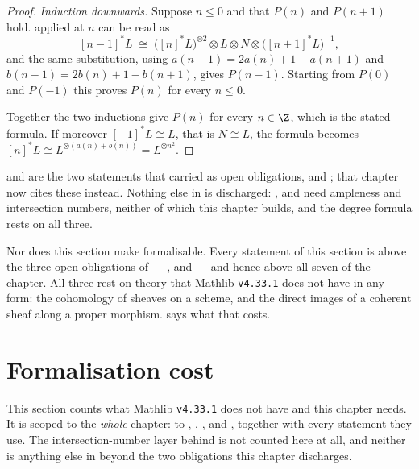 \begin{proof}
\emph{Induction downwards.}  Suppose $n\leq0$ and that $P(n)$ and $P(n+1)$
hold.   applied at $n$ can be read as
\[
  [n-1]^*L\;\cong\;\bigl([n]^*L\bigr)^{\otimes2}\otimes L\otimes N\otimes
  \bigl([n+1]^*L\bigr)^{-1} ,
\]
and the same substitution, using $a(n-1)=2a(n)+1-a(n+1)$ and
$b(n-1)=2b(n)+1-b(n+1)$, gives $P(n-1)$.  Starting from $P(0)$ and $P(-1)$
this proves $P(n)$ for every $n\leq0$.

Together the two inductions give $P(n)$ for every $n\in\Z$, which is the stated
formula.  If moreover $[-1]^*L\cong L$, that is $N\cong L$, the formula becomes
$[n]^*L\cong L^{\otimes(a(n)+b(n))}=L^{\otimes n^2}$.
\end{proof}

\begin{remark}
\label{rem:cube-discharged}
 and  are the two statements
that  carried as open obligations,  and
; that chapter now cites these instead.  Nothing
else in  is discharged: ,
 and 
need ampleness and intersection numbers, neither of which this chapter builds,
and the degree formula  rests on all three.

Nor does this section make  formalisable.  Every
statement of this section is above the three open obligations of
 --- ,
 and  --- and
hence above all seven of the chapter.  All three rest on theory that Mathlib
\texttt{v4.33.1} does not have in any form: the cohomology of sheaves on a
scheme, and the direct images of a coherent sheaf along a proper morphism.
 says what that costs.
\end{remark}

\section{Formalisation cost}\label{sec:cube-cost}

This section counts what Mathlib \texttt{v4.33.1} does not have and this
chapter needs.  It is scoped to the \emph{whole} chapter: to
, , ,
 and , together with
every statement they use.  The intersection-number layer behind
 is not counted here at all, and neither is
anything else in  beyond the two obligations this chapter
discharges.

